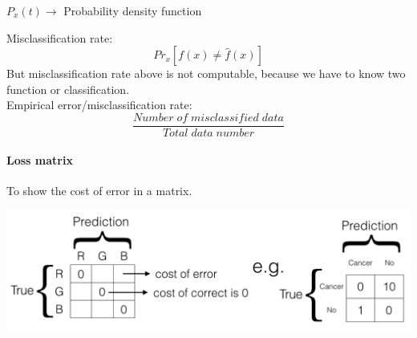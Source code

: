 \documentclass{article}
\begin{document}
{{{{            \begin{center}{
                \(P_x(t) \to \) Probability density function
            }
            \end{center}

            Misclassification rate: \[Pr_x[f(x)\not=\hat{f}(x)]\]
            But misclassification rate above is not computable, because we have to know two function or classification.\\

            Empirical error/misclassification rate: \[\frac{Number\;of\;misclassified\;data}{Total\;data\;number}\]

            \paragraph{Loss matrix}{
                To show the cost of error in a matrix.
                \begin{center}{
                    \includegraphics[scale=0.5]{lossmatrix.png}
                }
                \end{center}
            }

        }
}}}
\end{document}
